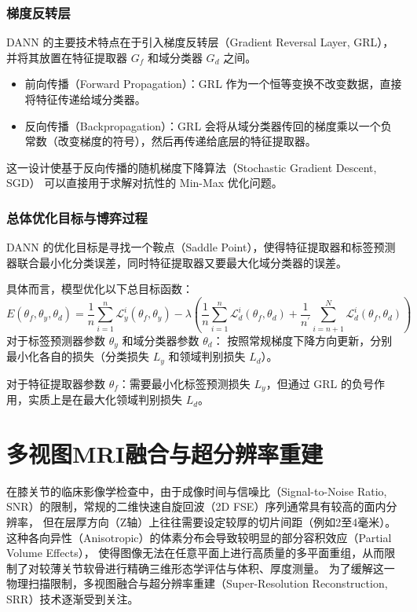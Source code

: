     \subsubsection{梯度反转层}
      DANN 的主要技术特点在于引入梯度反转层（Gradient Reversal Layer, GRL），并将其放置在特征提取器 $G_f$ 和域分类器 $G_d$ 之间。
      \begin{itemize}
        \item 前向传播（Forward Propagation）：GRL 作为一个恒等变换不改变数据，直接将特征传递给域分类器。
        \item 反向传播（Backpropagation）：GRL 会将从域分类器传回的梯度乘以一个负常数（改变梯度的符号），然后再传递给底层的特征提取器。
      \end{itemize}
      \par 这一设计使基于反向传播的随机梯度下降算法（Stochastic Gradient Descent, SGD）
      可以直接用于求解对抗性的 Min-Max 优化问题。
    \subsubsection{总体优化目标与博弈过程}
      DANN 的优化目标是寻找一个鞍点（Saddle Point），使得特征提取器和标签预测器联合最小化分类误差，同时特征提取器又要最大化域分类器的误差。
      \par 具体而言，模型优化以下总目标函数：
      \begin{equation}
        E\left(\theta_f, \theta_y, \theta_d\right)=\frac{1}{n} \sum_{i=1}^n \mathcal{L}_y^i\left(\theta_f, \theta_y\right)-\lambda\left(\frac{1}{n} \sum_{i=1}^n \mathcal{L}_d^i\left(\theta_f, \theta_d\right)+\frac{1}{n^{\prime}} \sum_{i=n+1}^N \mathcal{L}_d^i\left(\theta_f, \theta_d\right)\right)
      \end{equation}
      对于标签预测器参数 $\theta_y$ 和域分类器参数 $\theta_d$：
      按照常规梯度下降方向更新，分别最小化各自的损失（分类损失 $L_y$ 和领域判别损失 $L_d$）。
      \par 对于特征提取器参数 $\theta_f$：需要最小化标签预测损失 $L_y$，但通过 GRL 的负号作用，实质上是在最大化领域判别损失 $L_d$。

\section{多视图MRI融合与超分辨率重建}
  在膝关节的临床影像学检查中，由于成像时间与信噪比（Signal-to-Noise Ratio, SNR）的限制，常规的二维快速自旋回波（2D FSE）序列通常具有较高的面内分辨率，
  但在层厚方向（Z轴）上往往需要设定较厚的切片间距（例如2至4毫米）。
  这种各向异性（Anisotropic）的体素分布会导致较明显的部分容积效应（Partial Volume Effects），
  使得图像无法在任意平面上进行高质量的多平面重组，从而限制了对较薄关节软骨进行精确三维形态学评估与体积、厚度测量。
  为了缓解这一物理扫描限制，多视图融合与超分辨率重建（Super-Resolution Reconstruction, SRR）技术逐渐受到关注\cite{lomurnoImprovingMultiViewStereo2022}。
